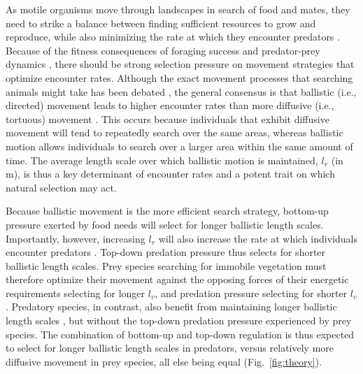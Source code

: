 \documentclass[12pt]{article}
\begin{document}


\noindent As motile organisms move through landscapes in search of food and mates, they need to strike a balance between finding sufficient resources to grow and reproduce, while also minimizing the rate at which they encounter predators \cite{Milinski:1978,Visser:2006}. Because of the fitness consequences of foraging success \cite{Charnov:1976wz, Lemon:1991} and predator-prey dynamics \cite{Volterra:1928,May:1972,Fryxell:2007}, there should be strong selection pressure on movement strategies that optimize encounter rates. Although the exact movement processes that searching animals might take has been debated \cite{Viswanathan:1999,Edwards:2007,Sims:2008,Martinez:2020}, the general consensus is that ballistic (i.e., directed) movement leads to higher encounter rates than more diffusive (i.e., tortuous) movement \cite{Viswanathan:1999,Visser:2006,Edwards:2007,Hutchinson:2007,Bartumeus:2008,Sims:2008}. This occurs because individuals that exhibit diffusive movement will tend to repeatedly search over the same areas, whereas ballistic motion allows individuals to search over a larger area within the same amount of time. The average length scale over which ballistic motion is maintained, $l_v$ (in m), is thus a key determinant of encounter rates \cite{Visser:2006, Tejedor:2012} and a potent trait on which natural selection may act.

Because ballistic movement is the more efficient search strategy, bottom-up pressure exerted by food needs will select for longer ballistic length scales. Importantly, however, increasing $l_v$ will also increase the rate at which individuals encounter predators \cite{Milinski:1978,Visser:2006}. Top-down predation pressure thus selects for shorter ballistic length scales. Prey species searching for immobile vegetation must therefore optimize their movement against the opposing forces of their energetic requirements selecting for longer $l_v$, and predation pressure selecting for shorter $l_v$ \cite{Visser:2006}. Predatory species, in contrast, also benefit from maintaining longer ballistic length scales \cite{Visser:2006}, but without the top-down predation pressure experienced by prey species. The combination of bottom-up and top-down regulation is thus expected to select for longer ballistic length scales in predators, versus relatively more diffusive movement in prey species, all else being equal \cite{Visser:2006} (Fig.~\ref{fig:theory}). 
\end{document}
